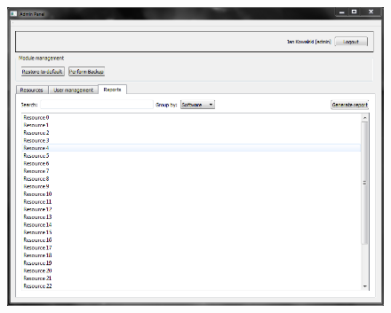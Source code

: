 \documentclass[11pt, a4paper, oneside]{report}
\begin{document}
\begin{figure}[H]
\centering
\includegraphics[scale=0.45]{admin_panel_reports.png}
\end{figure}
\end{document}
